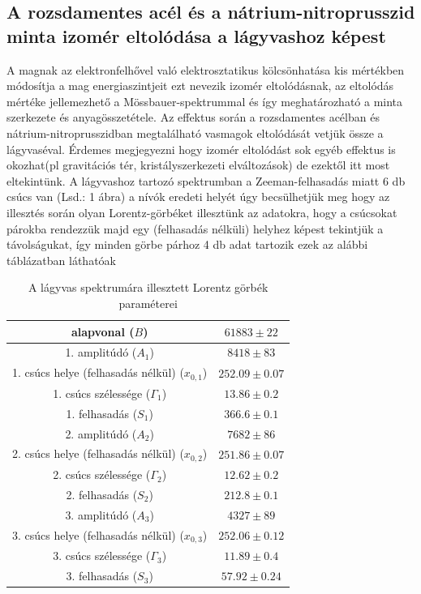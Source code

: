 \documentclass[a4paper,12pt]{article}
\numberwithin{equation}{subsection}
\begin{document}
\subsection{A rozsdamentes acél és a nátrium-nitroprusszid minta izomér eltolódása a lágyvashoz képest}
A magnak az elektronfelhővel való elektrosztatikus kölcsönhatása kis mértékben módosítja a mag energiaszintjeit ezt nevezik izomér eltolódásnak, az eltolódás mértéke jellemezhető a Mössbauer-spektrummal és így meghatározható a minta szerkezete és anyagösszetétele. Az effektus során a rozsdamentes acélban és nátrium-nitroprusszidban megtalálható vasmagok eltolódását vetjük össze a lágyvaséval. Érdemes megjegyezni hogy izomér eltolódást sok egyéb effektus is okozhat(pl gravitációs tér, kristályszerkezeti elváltozások) de ezektől itt most eltekintünk.
A lágyvashoz tartozó spektrumban a Zeeman-felhasadás miatt 6 db csúcs van (Lsd.: 1 ábra) a nívók eredeti helyét úgy becsülhetjük meg hogy az illesztés során olyan Lorentz-görbéket illesztünk az adatokra, hogy a csúcsokat párokba rendezzük majd egy (felhasadás nélküli) helyhez képest tekintjük a távolságukat, így minden görbe párhoz 4 db adat tartozik ezek az alábbi táblázatban láthatóak 
\begin{table}[h!]
\centering
\begin{tabular}{|c|c|}
\hline
		alapvonal ($B$) & $61883 \pm 22 $\\
		\hline
		1. amplitúdó ($A_1$) & $8418 \pm 83 $\\
		\hline
		1. csúcs helye (felhasadás nélkül) ($x_{0, 1}$) & $252.09 \pm 0.07$\\
		\hline
		1. csúcs szélessége ($\Gamma_1$) & $13.86 \pm 0.2$\\
		\hline
		1. felhasadás ($S_1$) & $366.6 \pm 0.1$ \\
		\hline
		2. amplitúdó ($A_2$) & $7682 \pm 86 $\\
		\hline
		2. csúcs helye (felhasadás nélkül) ($x_{0, 2}$) & $251.86\pm 0.07$\\
		\hline
		2. csúcs szélessége ($\Gamma_2$) & $12.62 \pm 0.2 $\\
		\hline
		2. felhasadás ($S_2$) & $212.8 \pm 0.1$ \\
		\hline
		3. amplitúdó ($A_3$) & $4327 \pm 89 $\\
		\hline
		3. csúcs helye (felhasadás nélkül) ($x_{0, 3}$) & $252.06 \pm 0.12$\\
		\hline
		3. csúcs szélessége ($\Gamma_3$) & $11.89 \pm 0.4$\\
		\hline
		3. felhasadás ($S_3$) & $57.92 \pm 0.24$ \\
		\hline

\end{tabular}
\caption{A lágyvas spektrumára illesztett Lorentz görbék paraméterei}
\end{table}
\end{document}
